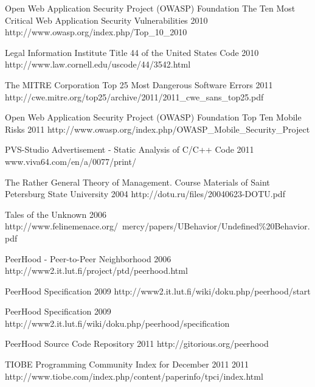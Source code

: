 \begin{thebibliography}{9}
		{Open Web Application Security Project (OWASP) Foundation}
		{The Ten Most Critical Web Application Security Vulnerabilities}
		{2010}
		{http://www.owasp.org/index.php/Top_10_2010}

		{Legal Information Institute}
		{Title 44 of the United States Code}
		{2010}
		{http://www.law.cornell.edu/uscode/44/3542.html}
	
		{The MITRE Corporation}
		{Top 25 Most Dangerous Software Errors}
		{2011}
		{http://cwe.mitre.org/top25/archive/2011/2011_cwe_sans_top25.pdf}
		
		{Open Web Application Security Project (OWASP) Foundation}
		{Top Ten Mobile Risks}
		{2011}
		{http://www.owasp.org/index.php/OWASP_Mobile_Security_Project}
		
		{
			\BibAnd
			}
		{PVS-Studio Advertisement - Static Analysis of C/C++ Code}
		{2011}
		{www.viva64.com/en/a/0077/print/}


		{The Rather General Theory of Management. Course Materials of Saint Petersburg State
			University}
		{2004}
		{http://dotu.ru/files/20040623-DOTU.pdf}

		{Tales of the Unknown}
		{2006}
		{http://www.felinemenace.org/~mercy/papers/UBehavior/Undefined\%20Behavior.pdf}

		{PeerHood - Peer-to-Peer Neighborhood}
		{2006}
		{http://www2.it.lut.fi/project/ptd/peerhood.html}		

		{PeerHood Specification}
		{2009}
		{http://www2.it.lut.fi/wiki/doku.php/peerhood/start}

		{PeerHood Specification}
		{2009}
		{http://www2.it.lut.fi/wiki/doku.php/peerhood/specification}

		{PeerHood Source Code Repository}
		{2011}
		{http://gitorious.org/peerhood}
	
		{TIOBE Programming Community Index for December 2011}
		{2011}
		{http://www.tiobe.com/index.php/content/paperinfo/tpci/index.html}
	


\end{thebibliography}
